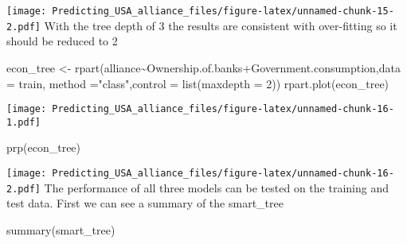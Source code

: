 \documentclass[
]{article}
\newenvironment{Shaded}{\begin{snugshade}}{\end{snugshade}}
\newcommand{\AttributeTok}[1]{\textcolor[rgb]{0.77,0.63,0.00}{#1}}
\newcommand{\DecValTok}[1]{\textcolor[rgb]{0.00,0.00,0.81}{#1}}
\newcommand{\FunctionTok}[1]{\textcolor[rgb]{0.00,0.00,0.00}{#1}}
\newcommand{\NormalTok}[1]{#1}
\newcommand{\OtherTok}[1]{\textcolor[rgb]{0.56,0.35,0.01}{#1}}
\newcommand{\SpecialCharTok}[1]{\textcolor[rgb]{0.00,0.00,0.00}{#1}}
\newcommand{\StringTok}[1]{\textcolor[rgb]{0.31,0.60,0.02}{#1}}
\begin{document}
\texttt{[image: Predicting\_USA\_alliance\_files/figure-latex/unnamed-chunk-15-2.pdf]}
With the tree depth of 3 the results are consistent with over-fitting so
it should be reduced to 2

\begin{Shaded}
\begin{Highlighting}[]
\NormalTok{econ\_tree }\OtherTok{\textless{}{-}} \FunctionTok{rpart}\NormalTok{(alliance}\SpecialCharTok{\textasciitilde{}}\NormalTok{Ownership.of.banks}\SpecialCharTok{+}\NormalTok{Government.consumption,}\AttributeTok{data =}\NormalTok{ train, }\AttributeTok{method =}\StringTok{"class"}\NormalTok{,}\AttributeTok{control =} \FunctionTok{list}\NormalTok{(}\AttributeTok{maxdepth =} \DecValTok{2}\NormalTok{))}
\FunctionTok{rpart.plot}\NormalTok{(econ\_tree)}
\end{Highlighting}
\end{Shaded}

\texttt{[image: Predicting\_USA\_alliance\_files/figure-latex/unnamed-chunk-16-1.pdf]}

\begin{Shaded}
\begin{Highlighting}[]
\FunctionTok{prp}\NormalTok{(econ\_tree)}
\end{Highlighting}
\end{Shaded}

\texttt{[image: Predicting\_USA\_alliance\_files/figure-latex/unnamed-chunk-16-2.pdf]}
The performance of all three models can be tested on the training and
test data. First we can see a summary of the smart\_tree

\begin{Shaded}
\begin{Highlighting}[]
\FunctionTok{summary}\NormalTok{(smart\_tree)}
\end{Highlighting}
\end{Shaded}
\end{document}
